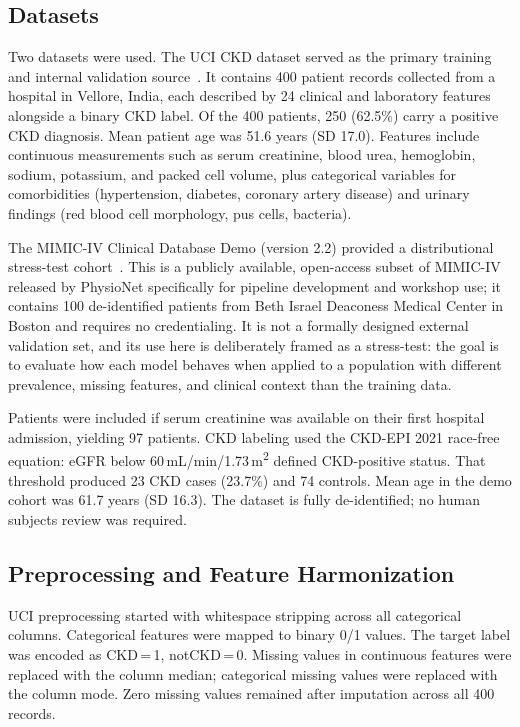 \subsection{Datasets}

Two datasets were used. The UCI CKD dataset served as the primary training and internal validation source~\cite{UCIDataset}. It contains 400 patient records collected from a hospital in Vellore, India, each described by 24 clinical and laboratory features alongside a binary CKD label. Of the 400 patients, 250 (62.5\%) carry a positive CKD diagnosis. Mean patient age was 51.6 years (SD 17.0). Features include continuous measurements such as serum creatinine, blood urea, hemoglobin, sodium, potassium, and packed cell volume, plus categorical variables for comorbidities (hypertension, diabetes, coronary artery disease) and urinary findings (red blood cell morphology, pus cells, bacteria).

The MIMIC-IV Clinical Database Demo (version 2.2) provided a distributional stress-test cohort~\cite{Johnson2023}. This is a publicly available, open-access subset of MIMIC-IV released by PhysioNet specifically for pipeline development and workshop use; it contains 100 de-identified patients from Beth Israel Deaconess Medical Center in Boston and requires no credentialing. It is not a formally designed external validation set, and its use here is deliberately framed as a stress-test: the goal is to evaluate how each model behaves when applied to a population with different prevalence, missing features, and clinical context than the training data.

Patients were included if serum creatinine was available on their first hospital admission, yielding 97 patients. CKD labeling used the CKD-EPI 2021 race-free equation: eGFR below 60\,mL/min/1.73\,m\textsuperscript{2} defined CKD-positive status. That threshold produced 23 CKD cases (23.7\%) and 74 controls. Mean age in the demo cohort was 61.7 years (SD 16.3). The dataset is fully de-identified; no human subjects review was required.

\subsection{Preprocessing and Feature Harmonization}

UCI preprocessing started with whitespace stripping across all categorical columns. Categorical features were mapped to binary 0/1 values. The target label was encoded as CKD\,=\,1, notCKD\,=\,0. Missing values in continuous features were replaced with the column median; categorical missing values were replaced with the column mode. Zero missing values remained after imputation across all 400 records.


